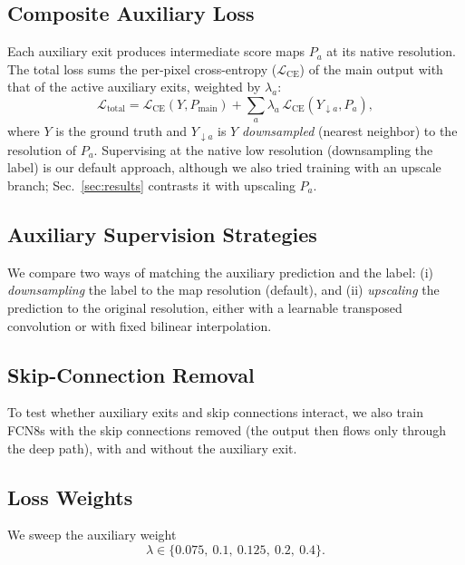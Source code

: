 \documentclass{article}
\begin{document}
    \subsection{Composite Auxiliary Loss}

    Each auxiliary exit produces intermediate score maps $P_a$ at its native
    resolution. The total loss sums the per-pixel cross-entropy
    ($\mathcal{L}_{\mathrm{CE}}$) of the main output with that of the active
    auxiliary exits, weighted by $\lambda_a$:
    \begin{equation}
    \mathcal{L}_{\mathrm{total}} = \mathcal{L}_{\mathrm{CE}}(Y, P_{\mathrm{main}})
    + \sum_{a} \lambda_a\, \mathcal{L}_{\mathrm{CE}}(Y_{\downarrow a}, P_a),
    \label{eq:loss}
    \end{equation}
    where $Y$ is the ground truth and $Y_{\downarrow a}$ is $Y$ \emph{downsampled}
    (nearest neighbor) to the resolution of $P_a$. Supervising at the native low
    resolution (downsampling the label) is our default approach, although we also tried training with an upscale branch; Sec.~\ref{sec:results}
    contrasts it with upscaling $P_a$.

    \subsection{Auxiliary Supervision Strategies}

    We compare two ways of matching the auxiliary prediction and the label:
    (i) \emph{downsampling} the label to the map resolution (default), and
    (ii) \emph{upscaling} the prediction to the original resolution, either with a
    learnable transposed convolution or with fixed bilinear interpolation.

    \subsection{Skip-Connection Removal}

    To test whether auxiliary exits and skip connections interact, we also train
    FCN8s with the skip connections removed (the output then flows only through
    the deep path), with and without the auxiliary exit.

    \subsection{Loss Weights}
    We sweep the auxiliary weight
\[
\lambda \in \{0.075,\ 0.1,\ 0.125,\ 0.2,\ 0.4\}.
\]
\end{document}
